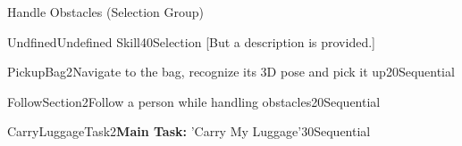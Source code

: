 
Handle Obstacles (Selection Group)
\begin{Group}{Undfined}{Undefined Skill}{40}{Selection}
    [But a description is provided.]
\end{Group}

\begin{Group}{PickupBag2}{Navigate to the bag, recognize its 3D pose and pick it up}{20}{Sequential}
\end{Group}


\begin{Group}{FollowSection2}{Follow a person while handling obstacles}{20}{Sequential}
\end{Group}


\begin{Group}{CarryLuggageTask2}{\textbf{\textcolor{myturquoise}{Main Task:}} 'Carry My Luggage'}{30}{Sequential}
\end{Group}


